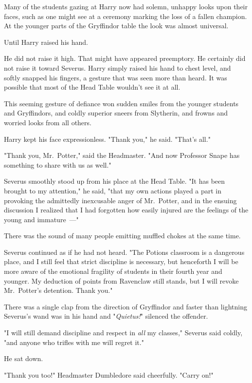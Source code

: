 Many of the students gazing at Harry now had solemn, unhappy looks upon their
faces, such as one might see at a ceremony marking the loss of a fallen
champion. At the younger parts of the Gryffindor table the look was almost
universal.

Until Harry raised his hand.

He did not raise it high. That might have appeared preemptory. He certainly did
not raise it toward Severus. Harry simply raised his hand to chest level, and
softly snapped his fingers, a gesture that was seen more than heard. It was
possible that most of the Head Table wouldn't see it at all.

This seeming gesture of defiance won sudden smiles from the younger students
and Gryffindors, and coldly superior sneers from Slytherin, and frowns and
worried looks from all others.

Harry kept his face expressionless. "Thank you," he said. "That's all."

"Thank you, Mr.~Potter," said the Headmaster. "And now Professor Snape has
something to share with us as well."

Severus smoothly stood up from his place at the Head Table. "It has been
brought to my attention," he said, "that my own actions played a part in
provoking the admittedly inexcusable anger of Mr.~Potter, and in the ensuing
discussion I realized that I had forgotten how easily injured are the feelings
of the young and immature~---"

There was the sound of many people emitting muffled chokes at the same time.

Severus continued as if he had not heard. "The Potions classroom is a dangerous
place, and I still feel that strict discipline is necessary, but henceforth I
will be more aware of the{\el} emotional fragility{\el} of students in
their fourth year and younger. My deduction of points from Ravenclaw still
stands, but I will revoke Mr.~Potter's detention. Thank you."

There was a single clap from the direction of Gryffindor and faster than
lightning Severus's wand was in his hand and "\emph{Quietus!}" silenced the
offender.

"I will still demand discipline and respect in \emph{all} my classes," Severus
said coldly, "and anyone who trifles with me will regret it."

He sat down.

"Thank you too!" Headmaster Dumbledore said cheerfully. "Carry on!"

